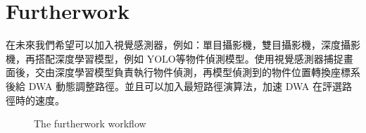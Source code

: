 \documentclass[crop=false]{standalone}
\begin{document}
	\section{Furtherwork}
	
	在未來我們希望可以加入視覺感測器，例如：單目攝影機，雙目攝影機，深度攝影機，再搭配深度學習模型，例如 YOLO等物件偵測模型。使用視覺感測器捕捉畫面後，交由深度學習模型負責執行物件偵測，再模型偵測到的物件位置轉換座標系後給 DWA 動態調整路徑。並且可以加入最短路徑演算法，加速 DWA 在評選路徑時的速度。
	
	\begin{figure*}[thbp!]
		\centering
		\caption{The furtherwork workflow}
		\label{fig:furtherwork}
	\end{figure*}
\end{document}
